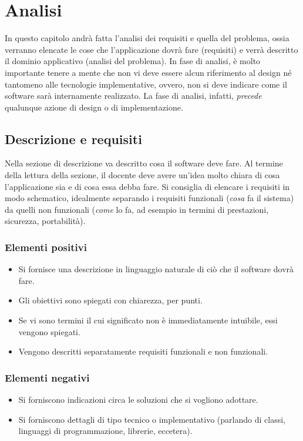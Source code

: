 \documentclass[a4paper,12pt]{report}
\begin{document}
\tableofcontents

\chapter{Analisi}

In questo capitolo andrà fatta l'analisi dei requisiti e quella del problema, ossia verranno elencate le cose che
l'applicazione dovrà fare (requisiti) e verrà descritto il dominio applicativo (analisi del problema).
%
In fase di analisi, è molto importante tenere a mente che non vi deve essere alcun riferimento al design né tantomeno
alle tecnologie implementative, ovvero, non si deve indicare come il software sarà internamente realizzato.
%
La fase di analisi, infatti, \textit{precede} qualunque azione di design o di implementazione.

\section{Descrizione e requisiti}

Nella sezione di descrizione va descritto cosa il software deve fare.
%
Al termine della lettura della sezione,
il docente deve avere un'idea molto chiara di cosa l'applicazione sia
e di cosa essa debba fare.
%
Si consiglia di elencare i requisiti in modo schematico, idealmente separando i requisiti funzionali
(\emph{cosa} fa il sistema)
da quelli non funzionali
(\emph{come} lo fa, ad esempio in termini di prestazioni, sicurezza, portabilità).

\subsection*{Elementi positivi}
\begin{itemize}
	\item Si fornisce una descrizione in linguaggio naturale di ciò che il software dovrà fare.
	\item Gli obiettivi sono spiegati con chiarezza, per punti.
	\item Se vi sono termini il cui significato non è immediatamente intuibile, essi vengono spiegati.
	\item Vengono descritti separatamente requisiti funzionali e non funzionali.
\end{itemize}

\subsection*{Elementi negativi}
\begin{itemize}
	\item Si forniscono indicazioni circa le soluzioni che si vogliono adottare.
	\item Si forniscono dettagli di tipo tecnico o implementativo (parlando di classi, linguaggi di programmazione, librerie, eccetera).
\end{itemize}
\end{document}
